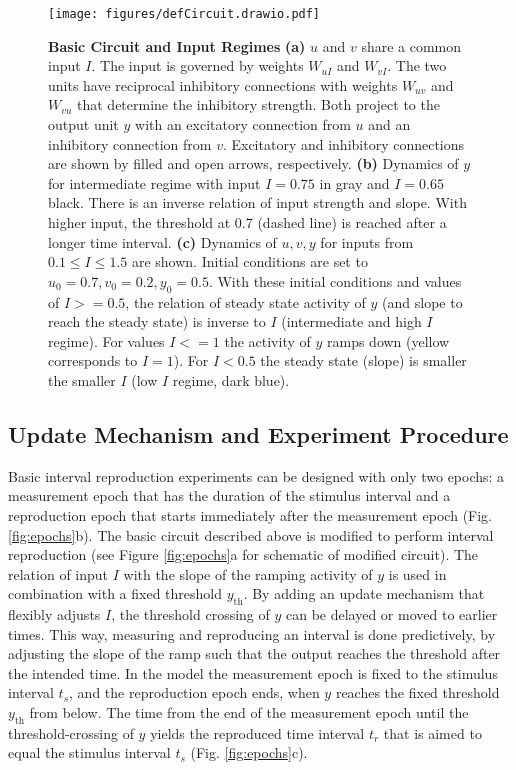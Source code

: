 \documentclass[10pt]{article}
\begin{document}
\begin{figure}[ht]
	\centering
	\texttt{[image: figures/defCircuit.drawio.pdf]}
	\caption{\textbf{Basic Circuit and Input Regimes} 
	\textbf{(a)} $u$ and $v$ share a common input $I$. The input is governed by weights $W_{uI}$ and $W_{vI}$. The two units have reciprocal inhibitory connections with weights $W_{uv}$ and $W_{vu}$ that determine the inhibitory strength. Both project to the output unit $y$ with an excitatory connection from $u$ and an inhibitory connection from $v$. Excitatory and inhibitory connections are shown by filled and open arrows, respectively. 
	\textbf{(b)} Dynamics of $y$ for intermediate regime with input $I=0.75$ in gray and $I=0.65$ black. There is an inverse relation of input strength and slope. With higher input, the threshold at 0.7 (dashed line) is reached after a longer time interval. 
	\textbf{(c)} Dynamics of $u, v, y$ for inputs from $0.1\leq I \leq 1.5$ are shown. Initial conditions are set to $u_0=0.7 , v_0=0.2 , y_0=0.5$. With these initial conditions and values of $I>=0.5$, the relation of steady state activity of $y$ (and slope to reach the steady state) is inverse to $I$ (intermediate and high $I$ regime). For values $I<=1$ the activity of $y$ ramps down (yellow corresponds to $I=1$). For $I<0.5$ the steady state (slope) is smaller the smaller $I$ (low $I$ regime, dark blue).}
\label{fig:circuit}
\end{figure}


\subsection{Update Mechanism and Experiment Procedure}
Basic interval reproduction experiments can be designed with only two epochs: a measurement epoch that has the duration of the stimulus interval and a reproduction epoch that starts immediately after the measurement epoch (Fig. \ref{fig:epochs}b). 
The basic circuit described above is modified to perform interval reproduction (see Figure \ref{fig:epochs}a for schematic of modified circuit).
The relation of input $I$ with the slope of the ramping activity of $y$ is used in combination with a fixed threshold $y_{\text{th}}$.
By adding an update mechanism that flexibly adjusts $I$, the threshold crossing of $y$ can be delayed or moved to earlier times.
This way, measuring and reproducing an interval is done predictively, by adjusting the slope of the ramp such that the output reaches the threshold after the intended time.
In the model the measurement epoch is fixed to the stimulus interval $t_s$, and the reproduction epoch ends, when $y$ reaches the fixed threshold $y_{\text{th}}$ from below. 
The time from the end of the measurement epoch until the threshold-crossing of $y$ yields the reproduced time interval $t_r$ that is aimed to equal the stimulus interval $t_s$ (Fig. \ref{fig:epochs}c).
\end{document}
